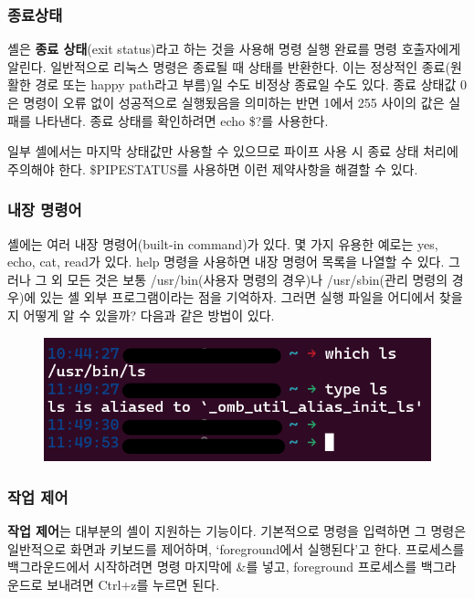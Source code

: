 \subsubsection*{종료상태}
\begin{flushleft}
    셸은 \textbf{종료 상태}(exit status)라고 하는 것을 사용해 명령 실행 완료를 명령 호출자에게 알린다.
    일반적으로 리눅스 명령은 종료될 때 상태를 반환한다.
    이는 정상적인 종료(원활한 경로 또는 happy path라고 부름)일 수도 비정상 종료일 수도 있다.
    종료 상태값 0은 명령이 오류 없이 성공적으로 실행됬음을 의미하는 반면
    1에서 255 사이의 값은 실패를 나타낸다.
    종료 상태를 확인하려면 echo \$?를 사용한다.
\end{flushleft}

\begin{flushleft}
    일부 셸에서는 마지막 상태값만 사용할 수 있으므로
    파이프 사용 시 종료 상태 처리에 주의해야 한다.
    \$PIPESTATUS를 사용하면 이런 제약사항을 해결할 수 있다.
\end{flushleft}

\subsubsection*{내장 명령어}
\begin{flushleft}
    셸에는 여러 내장 명령어(built-in command)가 있다.
    몇 가지 유용한 예로는 yes, echo, cat, read가 있다.
    help 명령을 사용하면 내장 명령어 목록을 나열할 수 있다.
    그러나 그 외 모든 것은 보통 /usr/bin(사용자 명령의 경우)나 /usr/sbin(관리 명령의 경우)에 있는
    셸 외부 프로그램이라는 점을 기억하자.
    그러면 실행 파일을 어디에서 찾을지 어떻게 알 수 있을까?
    다음과 같은 방법이 있다.
\end{flushleft}

\begin{figure}[h]
    \includegraphics[width=15cm]{resource/3-built-in.png}
\end{figure}


\subsubsection*{작업 제어}
\begin{flushleft}
    \textbf{작업 제어}는 대부분의 셸이 지원하는 기능이다.
    기본적으로 명령을 입력하면 그 명령은 일반적으로 화면과 키보드를 제어하며,
    `foreground에서 실행된다'고 한다.
    프로세스를 백그라운드에서 시작하려면 명령 마지막에 \&를 넣고,
    foreground 프로세스를 백그라운드로 보내려면 Ctrl+z를 누르면 된다.
\end{flushleft}

